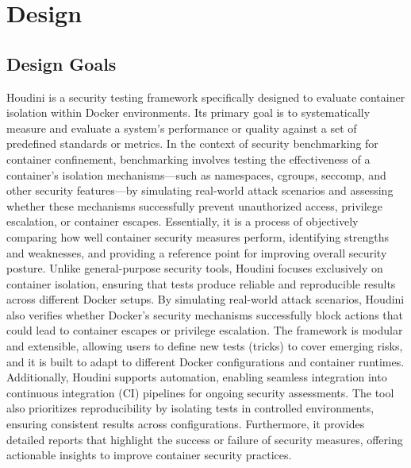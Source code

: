 \section{Design}
\label{sec:design}

\subsection{Design Goals}

Houdini is a security testing framework specifically designed to evaluate container isolation within Docker environments. Its primary goal is to systematically measure and evaluate a system's performance or quality against a set of predefined standards or metrics. In the context of security benchmarking for container confinement, benchmarking involves testing the effectiveness of a container's isolation mechanisms—such as namespaces, cgroups, seccomp, and other security features—by simulating real-world attack scenarios and assessing whether these mechanisms successfully prevent unauthorized access, privilege escalation, or container escapes. Essentially, it is a process of objectively comparing how well container security measures perform, identifying strengths and weaknesses, and providing a reference point for improving overall security posture. Unlike general-purpose security tools, Houdini focuses exclusively on container isolation, ensuring that tests produce reliable and reproducible results across different Docker setups. By simulating real-world attack scenarios, Houdini also verifies whether Docker’s security mechanisms successfully block actions that could lead to container escapes or privilege escalation. The framework is modular and extensible, allowing users to define new tests (tricks) to cover emerging risks, and it is built to adapt to different Docker configurations and container runtimes. Additionally, Houdini supports automation, enabling seamless integration into continuous integration (CI) pipelines for ongoing security assessments. The tool also prioritizes reproducibility by isolating tests in controlled environments, ensuring consistent results across configurations. Furthermore, it provides detailed reports that highlight the success or failure of security measures, offering actionable insights to improve container security practices.

